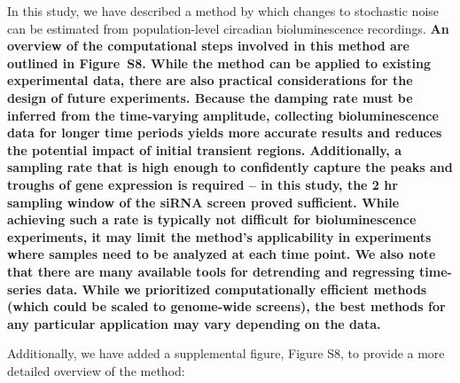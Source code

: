 \documentclass[11pt, letterpaper]{article}
\newenvironment{manuscript}[1]{\begin{center}\begin{tcolorbox}[colback=green!5!white,colframe=green!75!black,width=\textwidth,title={#1},breakable,fonttitle=\bfseries]}{\end{tcolorbox}\end{center}}
\begin{document}
\begin{manuscript}{Page 9}
 In this study, we have described a method by which changes to stochastic noise can be estimated from population-level circadian bioluminescence recordings.
 {\bfseries
An overview of the computational steps involved in this method are outlined in Figure~S8.
While the method can be applied to existing experimental data, there are also practical considerations for the design of future experiments.
Because the damping rate must be inferred from the time-varying amplitude, collecting bioluminescence data for longer time periods yields more accurate results and reduces the potential impact of initial transient regions.
Additionally, a sampling rate that is high enough to confidently capture the peaks and troughs of gene expression is required -- in this study, the 2 hr sampling window of the siRNA screen proved sufficient.
While achieving such a rate is typically not difficult for bioluminescence experiments, it may limit the method's applicability in experiments where samples need to be analyzed at each time point.
We also note that there are many available tools for detrending and regressing time-series data.
While we prioritized computationally efficient methods (which could be scaled to genome-wide screens), the best methods for any particular application may vary depending on the data.
}
\end{manuscript}

Additionally, we have added a supplemental figure, Figure S8, to provide a more detailed overview of the method:
\end{document}
